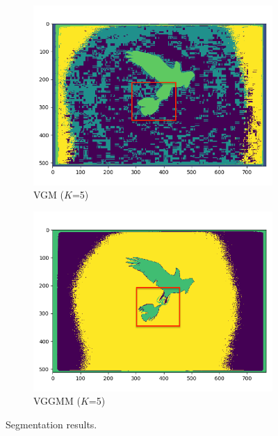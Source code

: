 \documentclass[conference]{IEEEtran}
\begin{document}
\begin{figure}
    \centering
    \begin{subfigure}{.5\linewidth}
        \centering
        \includegraphics[width=1\textwidth]{imgresults/eagle_vgm.png}
        \caption{VGM ($K$=5)}
        \label{fig:sub1}
    \end{subfigure}%
    \begin{subfigure}{.5\linewidth}
        \centering
        \includegraphics[width=1\textwidth]{imgresults/eagle_vggm.png}
        \caption{VGGMM ($K$=5)}
        \label{fig:sub2}
    \end{subfigure}
    \caption{Segmentation results.}
    \label{fig:eagle}
\end{figure}


\end{document}
